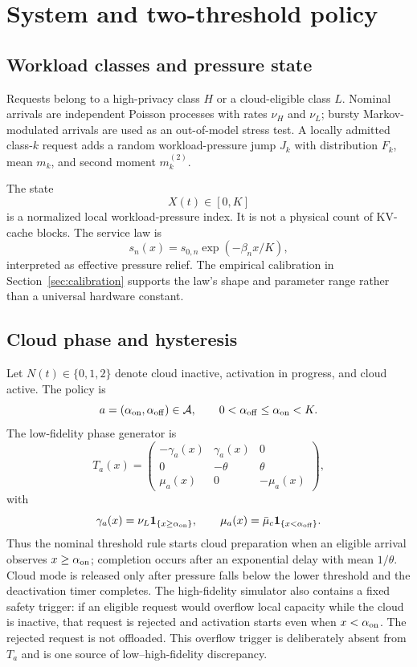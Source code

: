 \documentclass[preprint,12pt]{elsarticle}
\newcommand{\Aset}{\mathcal{A}}
\begin{document}
\section{System and two-threshold policy}
\label{sec:model}

\subsection{Workload classes and pressure state}

Requests belong to a high-privacy class $H$ or a cloud-eligible class $L$. Nominal arrivals are independent Poisson processes with rates $\nu_H$ and $\nu_L$; bursty Markov-modulated arrivals are used as an out-of-model stress test. A locally admitted class-$k$ request adds a random workload-pressure jump $J_k$ with distribution $F_k$, mean $m_k$, and second moment $m_k^{(2)}$.

The state
\[
X(t)\in[0,K]
\]
is a normalized local workload-pressure index. It is not a physical count of KV-cache blocks. The service law is
\[
s_n(x)=s_{0,n}\exp(-\beta_n x/K),
\]
interpreted as effective pressure relief. The empirical calibration in Section~\ref{sec:calibration} supports the law's shape and parameter range rather than a universal hardware constant.

\subsection{Cloud phase and hysteresis}

Let $N(t)\in\{0,1,2\}$ denote cloud inactive, activation in progress, and cloud active. The policy is
\[
a=(\alpha_{\rm on},\alpha_{\rm off})\in\Aset,
\qquad
0<\alpha_{\rm off}\le\alpha_{\rm on}<K.
\]
The low-fidelity phase generator is
\[
T_a(x)=
\begin{pmatrix}
-\gamma_a(x)&\gamma_a(x)&0\\
0&-\theta&\theta\\
\mu_a(x)&0&-\mu_a(x)
\end{pmatrix},
\]
with
\[
\gamma_a(x)=\nu_L\mathbf 1_{\{x\ge\alpha_{\rm on}\}},
\qquad
\mu_a(x)=\bar\mu_c\mathbf 1_{\{x<\alpha_{\rm off}\}}.
\]
Thus the nominal threshold rule starts cloud preparation when an eligible arrival observes $x\ge\alpha_{\rm on}$; completion occurs after an exponential delay with mean $1/\theta$. Cloud mode is released only after pressure falls below the lower threshold and the deactivation timer completes. The high-fidelity simulator also contains a fixed safety trigger: if an eligible request would overflow local capacity while the cloud is inactive, that request is rejected and activation starts even when $x<\alpha_{\rm on}$. The rejected request is not offloaded. This overflow trigger is deliberately absent from $T_a$ and is one source of low--high-fidelity discrepancy.
\end{document}
